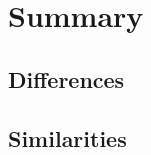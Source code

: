 \section{Summary}
\label{sec:summary}

\subsection{Differences}\label{subsec:differences}

\subsection{Similarities}\label{subsec:similarities}
